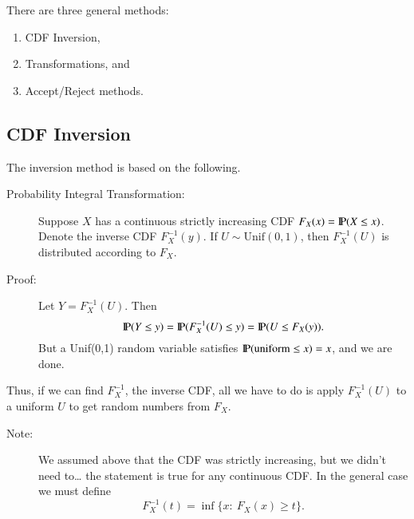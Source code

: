 \documentclass[11pt,english]{scrbook}
\begin{document}
There are three general methods: 
\begin{enumerate}
\item CDF Inversion,
\item Transformations, and
\item Accept/Reject methods.
\end{enumerate}

\subsection{CDF Inversion}
\label{sec:orgb633d62}

The inversion method is based on the following.

\begin{description}
\item[{Probability Integral Transformation:}] Suppose \(X\) has a continuous strictly increasing CDF \(F_{X}(x)=\P(X \leq x)\). Denote the inverse CDF \(F_{X}^{-1}(y)\).  If \(U\sim\mathrm{Unif}(0,1)\), then \(F_{X}^{-1}(U)\) is distributed according to \(F_{X}\).

\item[{Proof:}] Let \(Y = F_{X}^{-1}(U)\). Then 
\[
  \P(Y \leq y)=\P(F_{X}^{-1}(U)\leq y)=\P(U\leq F_{X}(y)).
  \]
But a Unif(0,1) random variable satisfies \(\P(\mbox{uniform}\leq x) = x\), and we are done.
\end{description}

Thus, if we can find \(F_{X}^{-1}\), the inverse CDF, all we have to do is apply \(F_{X}^{-1}(U)\) to a uniform \(U\) to get random numbers from \(F_{X}\).

\begin{description}
\item[{Note:}] We assumed above that the CDF was strictly increasing, but we didn't need to\ldots{} the statement is true for any continuous CDF. In the general case we must define 
\[
  F_{X}^{-1}(t)=\inf\{x:\ F_{X}(x)\geq t\}.
  \]
\end{description}
\end{document}
